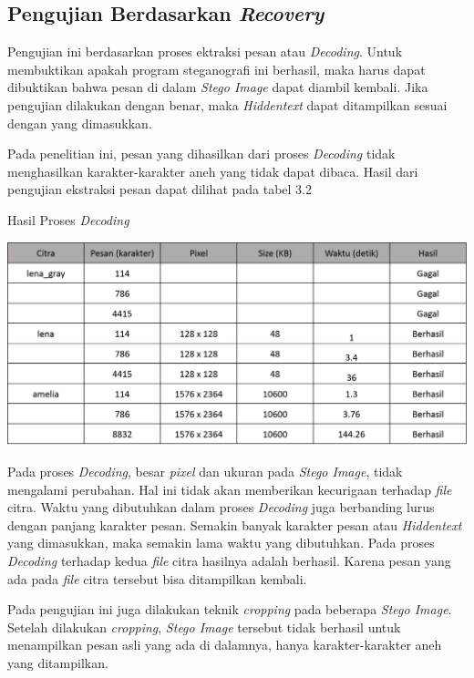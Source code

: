 	\subsection{Pengujian Berdasarkan \emph{Recovery}}
	Pengujian ini berdasarkan proses ektraksi pesan atau \emph{Decoding}. Untuk membuktikan apakah program steganografi ini berhasil, maka harus dapat dibuktikan bahwa pesan di dalam \emph{Stego Image} dapat diambil kembali. Jika pengujian dilakukan dengan benar, maka \emph{Hiddentext} dapat ditampilkan sesuai dengan yang dimasukkan. 
	
	Pada penelitian ini, pesan yang dihasilkan dari proses \emph{Decoding} tidak menghasilkan karakter-karakter aneh yang tidak dapat dibaca. Hasil dari pengujian ekstraksi pesan dapat dilihat pada tabel 3.2
	 
	\begin{table}[H]
		\centering
		\caption{Hasil Proses \emph{Decoding}}
		\includegraphics[width=1.0\textwidth]{gambar/table_hasildecode3}
		\label{tabel_hasildecode3}
	\end{table}
	
	Pada proses \emph{Decoding}, besar \emph{pixel} dan ukuran pada \emph{Stego Image}, tidak mengalami perubahan. Hal ini tidak akan memberikan kecurigaan terhadap \emph{file} citra. Waktu yang dibutuhkan dalam proses \emph{Decoding} juga berbanding lurus dengan panjang karakter pesan. Semakin banyak karakter pesan atau \emph{Hiddentext} yang dimasukkan, maka semakin lama waktu yang dibutuhkan. Pada proses \emph{Decoding} terhadap kedua \emph{file} citra hasilnya adalah berhasil. Karena pesan yang ada pada \emph{file} citra tersebut bisa ditampilkan kembali.
	
	Pada pengujian ini juga dilakukan teknik \emph{cropping} pada beberapa \emph{Stego Image}. Setelah dilakukan \emph{cropping}, \emph{Stego Image} tersebut tidak berhasil untuk menampilkan pesan asli yang ada di dalamnya, hanya karakter-karakter aneh yang ditampilkan. 
	
